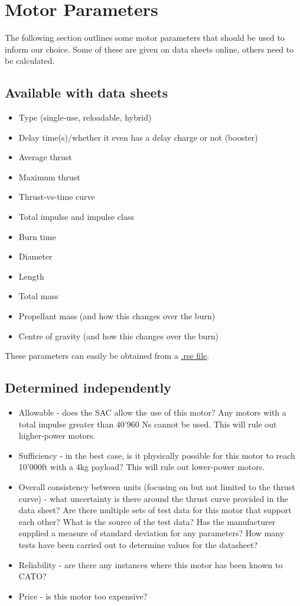 \documentclass[11pt,table]{article}
\begin{document}
\section*{Motor Parameters}
The following section outlines some motor parameters that should be used to inform our choice. Some of these are given
on data sheets online, others need to be calculated.

\subsection*{Available with data sheets}
\begin{itemize}
	\item Type (single-use, reloadable, hybrid)
	\item Delay time(s)/whether it even has a delay charge or not (booster)
    \item Average thrust
    \item Maximum thrust
    \item Thrust-vs-time curve
    \item Total impulse and impulse class
    \item Burn time
    \item Diameter
    \item Length
    \item Total mass
    \item Propellant mass (and how this changes over the burn)
    \item Centre of gravity (and how this changes over the burn)
\end{itemize}

These parameters can easily be obtained from a \href{http://wiki.openrocket.info/RSE_File}{.rse file}.

\subsection*{Determined independently}
\begin{itemize}
	\item Allowable - does the SAC allow the use of this motor? Any motors with a total impulse greater than 40'960 Ns
		cannot be used. This will rule out higher-power motors.
	\item Sufficiency - in the best case, is it physically possible for this motor to reach 10'000ft with a 4kg payload?
		This will rule out lower-power motors.
	\item Overall consistency between units (focusing on but not limited to the thrust curve) - what uncertainty is
		there around the thrust curve provided in the data sheet? Are there multiple sets of test data for this motor
		that support each other? What is the source of the test data? Has the manufacturer supplied a measure of
		standard deviation for any parameters? How many tests have been carried out to determine values for the
		datasheet?
	\item Reliability - are there any instances where this motor has been known to CATO?
	\item Price - is this motor too expensive?
\end{itemize}
\end{document}
